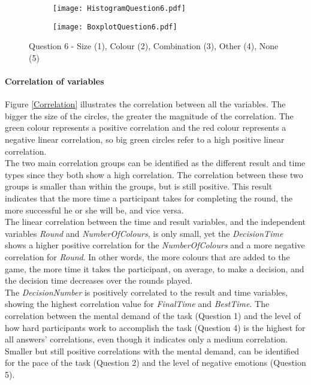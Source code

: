 \begin{figure}[htbp] %
\begin{center} 
\begin{subfigure} 
\centering
\texttt{[image: HistogramQuestion6.pdf]}
\end{subfigure} 
\begin{subfigure} 
\centering
\texttt{[image: BoxplotQuestion6.pdf]}
\end{subfigure}
  \caption[Question 6 - Histogram and Box plot]{Question 6 - Size (1), Colour (2), Combination (3), Other (4), None (5)}
    \label{Question6} 
\end{center}
\end{figure} 
\newpage
\paragraph{Correlation of variables}
Figure \ref{Correlation} illustrates the correlation between all the variables. The bigger the size of the circles, the greater the magnitude of the correlation. The green colour represents a positive correlation and the red colour represents a negative linear correlation, so big green circles refer to a high positive linear correlation.\\
The two main correlation groups can be identified as the different result and time types since they both show a high correlation. The correlation between these two groups is smaller than within the groups, but is still positive. This result indicates that the more time a participant takes for completing the round, the more successful he or she will be, and vice versa.\\
The linear correlation between the time and result variables, and the independent variables \textit{Round} and \textit{NumberOfColours}, is only small, yet the \textit{DecisionTime} shows a higher positive correlation for the \textit{NumberOfColours} and a more negative correlation for \textit{Round}. In other words, the more colours that are added to the game, the more time it takes the participant, on average, to make a decision, and the decision time decreases over the rounds played.\\
The \textit{DecisionNumber} is positively correlated to the result and time variables, showing the highest correlation value for \textit{FinalTime} and \textit{BestTime}. The correlation between the mental demand of the task (Question 1) and the level of how hard participants work to accomplish the task (Question 4) is the highest for all answers' correlations, even though it indicates only a medium correlation. Smaller but still positive correlations with the mental demand, can be identified for the pace of the task (Question 2) and the level of negative emotions (Question 5).\\
